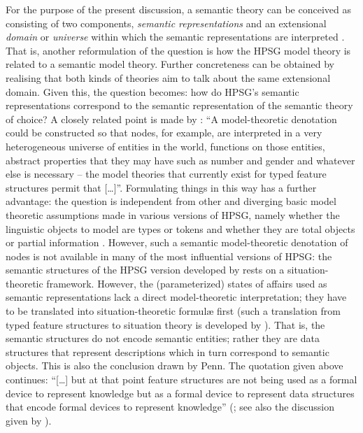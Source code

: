 \documentclass[output=paper
 	        ,biblatex
                ,babelshorthands
                ,newtxmath
                ,draftmode
                ,colorlinks, citecolor=brown
]{langscibook}
\begin{document}
For the purpose of the present discussion, a semantic theory can be conceived as consisting of two components, \emph{semantic representations} and an extensional \emph{domain} or \emph{universe} within which the semantic representations are interpreted \citep{Zimmermann:2011:a,Kempson:2011}. 
%
That is, another reformulation of the question is how the HPSG model theory is related to a semantic model theory.
%
Further concreteness can be obtained by realising that both kinds of theories aim to talk about the same extensional domain. %
%
 Given this, the question becomes:  how do HPSG's semantic representations correspond to the semantic representation of the semantic theory of choice?
%
A closely related point is made by \citet[]{Penn:2000}: \enquote{A model-theoretic denotation could be constructed so that nodes, for example, are interpreted in a very heterogeneous universe of entities in the world, functions on those entities, abstract properties that they may have such as number and gender and whatever else is necessary -- the model theories that currently exist for typed feature structures permit that [\ldots]}.
%
Formulating things in  this way has a further advantage: the question is independent from other and diverging basic model theoretic assumptions made in various versions of HPSG, namely whether the linguistic objects to model are types \citep{Pollard:Sag:1994} or tokens \citep{Pollard:Sag:1987} and whether they are total objects \citep{Pollard:Sag:1994} or partial information \citep{Carpenter:1992}.
%
However, such a semantic model-theoretic denotation of nodes is not available in many of the most influential versions of HPSG: the semantic structures of the HPSG version developed by \citet{Pollard:Sag:1994} rests on a situation-theoretic framework.
%
However, the (parameterized) states of affairs used as semantic representations lack a direct model-theoretic interpretation; they have to be translated into  situation-theoretic formul{\ae} first (such a translation from typed feature structures to situation theory is developed by \citealp[Section.~3.6]{Ginzburg:Sag:2000}).
%
That is, the semantic structures do not encode semantic entities; rather they are data structures that represent descriptions which in turn correspond to semantic objects.
%
This is also the conclusion drawn by Penn.
%
The quotation given above continues: \enquote{[\ldots] but at that point feature structures are not being used as a formal device to represent knowledge but as a formal device to represent data structures that encode formal devices to represent knowledge} (\citealt[]{Penn:2000}; see also the discussion given by \citealt[Section~5.2.2]{Ginzburg:2012}).
\end{document}
